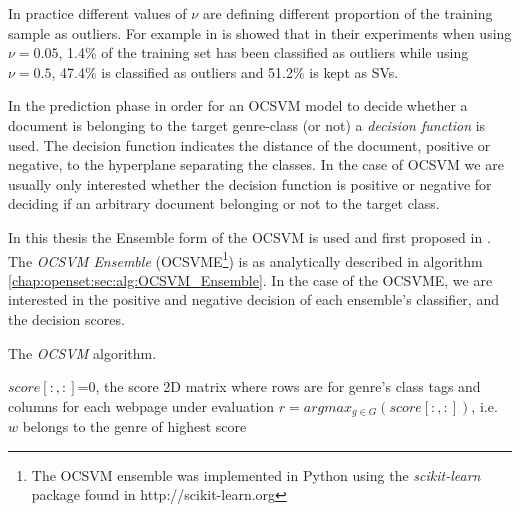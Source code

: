 In practice different values of $\nu$ are defining different proportion of the training sample as outliers. For example in \parencite{scholkopf1999estimating} is showed that in their experiments when using $\nu=0.05$, 1.4\% of the training set has been classified as outliers while using $\nu=0.5$, 47.4\% is classified as outliers and 51.2\% is kept as SVs.

In the prediction phase in order for an OCSVM model to decide whether a document is belonging to the target genre-class (or not) a \textit{decision function} is used. The decision function indicates the distance of the document, positive or negative, to the hyperplane separating the classes. In the case of OCSVM we are usually only interested whether the decision function is positive or negative for deciding if an arbitrary document belonging or not to the target class.

In this thesis the Ensemble form of the OCSVM is used and first proposed in \parencite{pritsos2013open}. The \textit{OCSVM Ensemble} (OCSVME\footnote{The OCSVM ensemble was implemented in Python using the \textit{scikit-learn} package found in http://scikit-learn.org}) is as analytically described in algorithm \ref{chap:openset:sec:alg:OCSVM_Ensemble}. In the case of the OCSVME, we are interested in the positive and negative decision of each ensemble's classifier, and the decision scores.

\hfill

\begin{algorithm}[H]
\caption{The \textit{OCSVM} algorithm.}\label{chap:openset:sec:alg:OCSVM_Ensemble}
$score[:, :]$=0, the score 2D matrix where rows are for genre's class tags and columns for each webpage under evaluation
{
        $r = argmax_{g \in G}(score[:, :])$, i.e. $w$ belongs to the genre of highest score\;
    }
\end{algorithm}

